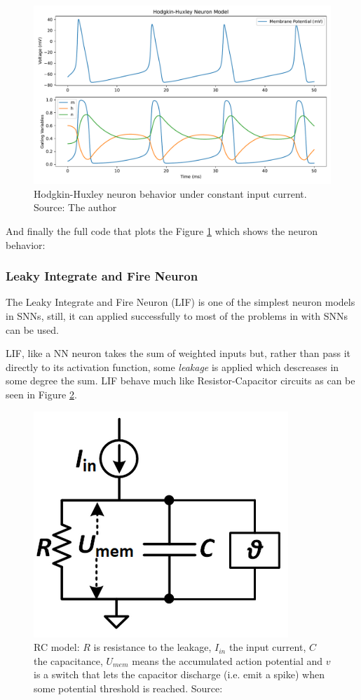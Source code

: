 			\begin{figure}[H]
				\centering
				\includegraphics[width=0.7\linewidth]{images/hodkinHuxleyNeuronBehavior}
				\caption[Hodgkin-Huxley neuron behavior]{Hodgkin-Huxley neuron behavior under constant input current. Source: The author}
				\label{fig:hodkinhuxleyneuronbehavior}
			\end{figure}
			
			\par And finally the full code that plots the Figure \ref{fig:hodkinhuxleyneuronbehavior} which shows the neuron behavior:
			
			

		\subsubsection{Leaky Integrate and Fire Neuron}
			\par The Leaky Integrate and Fire Neuron (LIF) is one of the simplest neuron models in SNNs, still, it can applied successfully to most of the problems in with SNNs can be used.
			\par LIF, like a NN neuron takes the sum of weighted inputs but, rather than pass it directly to its activation function, some \textit{leakage} is applied which descreases in some degree the sum. LIF behave much like Resistor-Capacitor circuits as can be seen in Figure \ref{fig:rcmodel}.
			
			\begin{figure}
				\centering
				\includegraphics[width=0.3\linewidth]{images/rcmodel}
				\caption[The RC model]{RC model: $R$ is resistance to the leakage, $I_{in}$ the input current, $C$ the capacitance, $U_{mem}$ means the accumulated action potential and $v$ is a switch that lets the capacitor discharge (i.e. emit a spike) when some potential threshold is reached. Source: \cite{10242251}}
				\label{fig:rcmodel}
			\end{figure}
			
